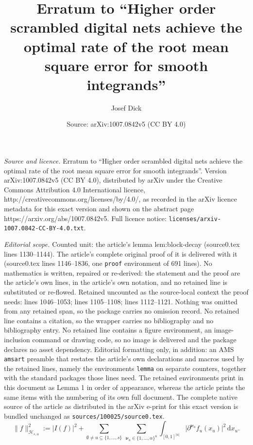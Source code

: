\documentclass[10pt,a4paper]{amsart}
\title{Erratum to ``Higher order scrambled digital nets achieve the optimal rate of the root mean square error for smooth integrands''}
\author{Josef Dick}
\date{Source: arXiv:1007.0842v5 (CC BY 4.0)}
\newcommand{\abs}[1]{\lvert #1\rvert}
\newcommand{\dd}{\,\mathrm d}
\newcommand{\norm}[1]{\lVert #1\rVert}
\begin{document}
\maketitle

\noindent\emph{Source and licence.} Erratum to ``Higher order scrambled digital nets achieve the optimal rate of the root mean square error for smooth integrands''. Version arXiv:1007.0842v5 (CC BY 4.0), distributed by arXiv under the Creative Commons Attribution 4.0 International licence, http://creativecommons.org/licenses/by/4.0/, as recorded in the arXiv licence metadata for this exact version and shown on the abstract page https://arxiv.org/abs/1007.0842v5. Full licence notice: \texttt{licenses/arxiv-1007.0842-CC-BY-4.0.txt}.\par\smallskip

\noindent\textit{Editorial scope.} Counted unit: the article's lemma lem:block-decay (source0.tex lines 1130--1144). The article's complete original proof of it is delivered with it (source0.tex lines 1146--1836, one \texttt{proof} environment of 691 lines). No mathematics is written, repaired or re-derived: the statement and the proof are the article's own lines, in the article's own notation, and no retained line is substituted or re-flowed.  Retained uncounted as the source-local context the proof needs: lines 1046--1053; lines 1105--1108; lines 1112--1121.  Nothing was omitted from any retained span, so the package carries no omission record.  No retained line contains a citation, so the wrapper carries no bibliography and no bibliography entry.  No retained line contains a figure environment, an image-inclusion command or drawing code, so no image is delivered and the package declares no asset dependency.  Editorial formatting only, in addition: an AMS \texttt{amsart} preamble that restates the article's own declarations and macros used by the retained lines, namely the environments \texttt{lemma} on separate counters, together with the standard packages those lines need.  The retained environments print in this document as Lemma 1 in order of appearance, whereas the article prints the same items with the numbering of its own full document.  The complete native source of the article as distributed in the arXiv e-print for this exact version is bundled unchanged as \texttt{sources/100025/source0.tex}.
\begin{equation}\label{eq:sobolev-norm}
 \norm{f}_{\mathcal H_{s,\alpha}}^2
 :=\abs{I(f)}^2
 +\sum_{\emptyset\ne u\subseteq\{1,\ldots,s\}}
   \ \sum_{\boldsymbol\nu_u\in\{1,\ldots,\alpha\}^{u}}
   \int_{[0,1]^{\abs u}}
   \abs{\partial^{\boldsymbol\nu_u}f_u(x_u)}^2\dd x_u.
\end{equation}
\end{document}
